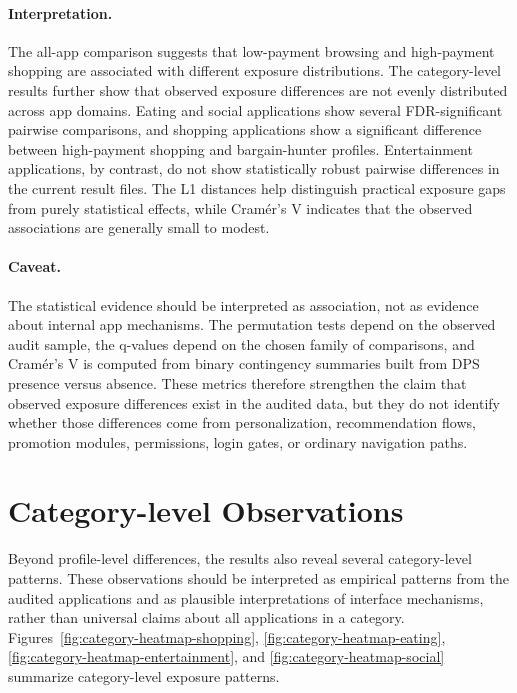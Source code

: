 \paragraph{Interpretation.}
The all-app comparison suggests that low-payment browsing and high-payment shopping are associated with different exposure distributions. The category-level results further show that observed exposure differences are not evenly distributed across app domains. Eating and social applications show several FDR-significant pairwise comparisons, and shopping applications show a significant difference between high-payment shopping and bargain-hunter profiles. Entertainment applications, by contrast, do not show statistically robust pairwise differences in the current result files. The L1 distances help distinguish practical exposure gaps from purely statistical effects, while Cramér's V indicates that the observed associations are generally small to modest.

\paragraph{Caveat.}
The statistical evidence should be interpreted as association, not as evidence about internal app mechanisms. The permutation tests depend on the observed audit sample, the q-values depend on the chosen family of comparisons, and Cramér's V is computed from binary contingency summaries built from DPS presence versus absence. These metrics therefore strengthen the claim that observed exposure differences exist in the audited data, but they do not identify whether those differences come from personalization, recommendation flows, promotion modules, permissions, login gates, or ordinary navigation paths.

\section{Category-level Observations}

Beyond profile-level differences, the results also reveal several category-level patterns. These observations should be interpreted as empirical patterns from the audited applications and as plausible interpretations of interface mechanisms, rather than universal claims about all applications in a category. Figures~\ref{fig:category-heatmap-shopping}, \ref{fig:category-heatmap-eating}, \ref{fig:category-heatmap-entertainment}, and \ref{fig:category-heatmap-social} summarize category-level exposure patterns.

